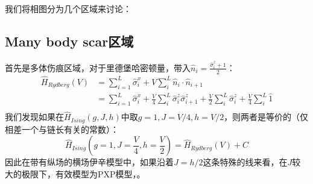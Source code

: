 我们将相图分为几个区域来讨论：


\subsection{Many body scar区域}
首先是多体伤痕区域，对于里德堡哈密顿量，带入$\hat{n}_i = \frac{\hat{\sigma}_i^z+1}{2}$：
\begin{equation}
\begin{split}
	\hat{H}_{Rydberg}(V) &= \sum_{i=1}^{L} \hat{\sigma}_{i}^{x} + V \sum_{i}^{L} \hat{n}_i\cdot\hat{n}_{i+1} \\
	\quad &= \sum_{i=1}^{L} \hat{\sigma}_{i}^{x} + \frac{V}{4}  \sum_{i}^L \hat{\sigma}_i^z\hat{\sigma}_{i+1}^z + \frac{V}{2} \sum_i^L \hat{\sigma}_i^z  + \frac{V}{4} \sum_i^L \hat{1} \\
\end{split}
\end{equation}
我们发现如果在$\hat{H}_{Ising}(g,J,h)$中取$g=1,J=V/4,h=V/2$，则两者是等价的（仅相差一个与链长有关的常数）：
\begin{equation}
\hat{H}_{Ising}(g=1,J=\frac{V}{4},h=\frac{V}{2}) = \hat{H}_{Rydberg}(V) + C
\end{equation}
因此在带有纵场的横场伊辛模型中，如果沿着$J=h/2$这条特殊的线来看，在$J$较大的极限下，有效模型为PXP模型，。

